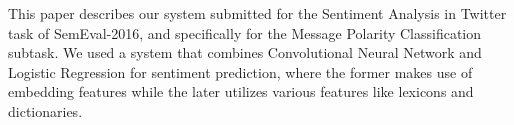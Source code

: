 This paper describes our system submitted for the Sentiment Analysis in Twitter task of SemEval-2016, and specifically for the Message Polarity Classification subtask. We used a system that combines Convolutional Neural Network and Logistic Regression for sentiment prediction, where the former makes use of embedding features while the later utilizes various features like lexicons and dictionaries.
